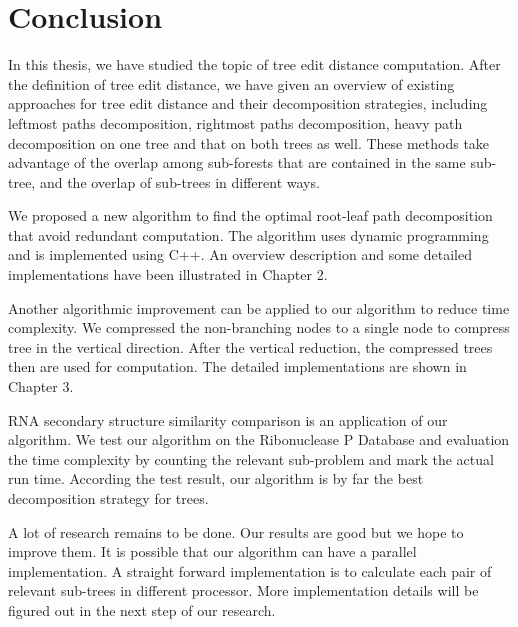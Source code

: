 \doublespacing
\chapter{Conclusion}
In this thesis, we have studied the topic of tree edit distance computation. After the definition of tree edit distance, we have given an overview of existing approaches for tree edit distance and their decomposition strategies, including leftmost paths decomposition, rightmost paths decomposition, heavy path decomposition on one tree and that on both trees as well. These methods take advantage of the overlap among sub-forests that are contained in the same sub-tree, and the overlap of sub-trees in different ways. 

We proposed a new algorithm to find the optimal root-leaf path decomposition that avoid redundant computation. The algorithm uses dynamic programming and is implemented using C++. An overview description and some detailed implementations have been illustrated in Chapter 2.

Another algorithmic improvement can be applied to our algorithm to reduce time complexity. We compressed the non-branching nodes to a single node to compress tree in the vertical direction. After the vertical reduction, the compressed trees then are used for computation. The detailed implementations are shown in Chapter 3.

RNA secondary structure similarity comparison is an application of our algorithm. We test our algorithm on the Ribonuclease P Database and evaluation the time complexity by counting the relevant sub-problem and mark the actual run time. According the test result, our algorithm is by far the best decomposition strategy for trees. 
 
A lot of research remains to be done. Our results are good but we hope to improve them. It is possible that our algorithm can have a parallel implementation. A straight forward implementation is to calculate each pair of relevant sub-trees in different processor. More implementation details will be figured out in the next step of our research.